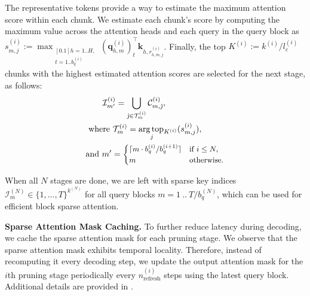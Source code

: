 The representative tokens provide a way to estimate the maximum attention score within each chunk. We estimate each chunk's score by computing the maximum value across the attention heads and each query in the query block as
$s^{(i)}_{m,j} := \max_{\text{{$\begin{matrix}[0.1] h=1..H, \\ t=1..b_q^{(i)}\!\!\!\!\! \end{matrix}$}}} (\bm{q}_{h,m}^{(i)})_{t}^\top \bm{k}_{h,r^{(i)}_{h,m,j}}$.
Finally, the top $K^{(i)} := k^{(i)}/l_c^{(i)}$ chunks with the highest estimated attention scores are selected for the next stage, as follows:
\begingroup%
\allowdisplaybreaks%
\begin{align}
    &\quad\quad\mathcal{I}^{(i)}_{m'} = \bigcup_{\hat{\jmath} \in \mathcal{T}^{(i)}_{m}} \mathcal{C}_{m, \hat{\jmath}}^{(i)}, \\
    &\text{ where } \mathcal{T}^{(i)}_{m} = \underset{j}{\text{arg\,top\,}}\!_{K^{(i)}} (s_{m,j}^{(i)}), \\
    &\text{and } m'=\text{\small$\begin{cases}
        \lceil m\cdot{b_q^{(i)}}/{b_q^{(i+1)}} \rceil & \text{if } i \leq N, \\
        m & \text{otherwise}.
    \end{cases}$}
\end{align}%
\endgroup

When all $N$ stages are done, we are left with sparse key indices $\mathcal{I}^{(N)}_m \in \{1, \dots, T\}^{k^{(N)}}$ for all query blocks $m = 1~..~T/b_q^{(N)}$, which can be used for efficient block sparse attention. 


\textbf{Sparse Attention Mask Caching.}
To further reduce latency during decoding, we cache the sparse attention mask for each pruning stage. We observe that the sparse attention mask exhibits temporal locality. Therefore, instead of recomputing it every decoding step, we update the output attention mask for the $i$th pruning stage periodically every $n_\text{refresh}^{(i)}$ steps using the latest query block. Additional details are provided in .

